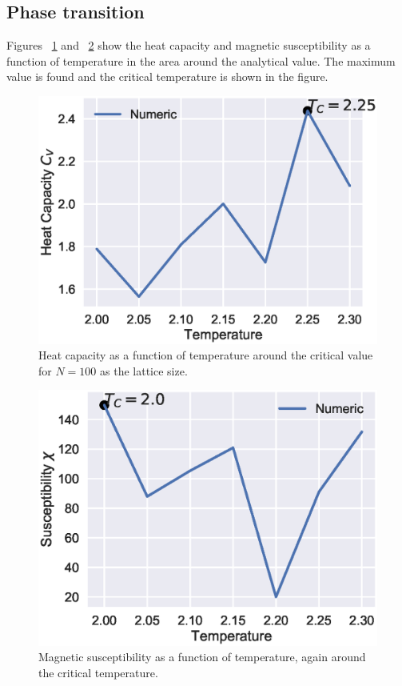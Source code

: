 \documentclass[aps,reprint]{revtex4-1}
\begin{document}
\subsection{Phase transition}
Figures ~\ref{fig:L100Cv} and ~\ref{fig:L100sus} show the heat capacity and
magnetic susceptibility as a function of temperature in the area around the analytical
value. The maximum value is found and the critical temperature is shown in the figure.
\begin{figure}
  \includegraphics[width=\columnwidth]{figures/L100Cv.eps}
  \caption{Heat capacity as a function of temperature around the critical value
  for $N = 100$ as the lattice size.}
  \label{fig:L100Cv}
\end{figure}
\begin{figure}
  \includegraphics[width=\columnwidth]{figures/L100sus.eps}
  \caption{Magnetic susceptibility as a function of temperature, again around the
  critical temperature.}
  \label{fig:L100sus}
\end{figure}
\end{document}
